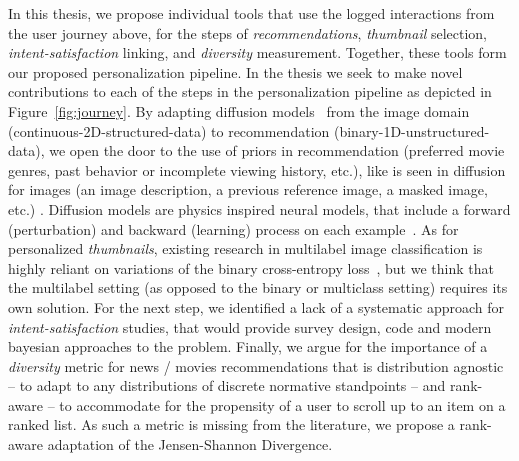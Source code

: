 
In this thesis, we propose individual tools that use the logged interactions from the user journey above, for the steps of \emph{recommendations}, \emph{thumbnail} selection, \emph{intent-satisfaction} linking, and \emph{diversity} measurement. 
Together, these tools form our proposed personalization pipeline. In the thesis we seek to make novel contributions to each of the steps in the personalization pipeline as depicted in Figure~\ref{fig:journey}.
By adapting diffusion models~\cite{jascha} from the image domain (continuous-2D-structured-data) to recommendation (binary-1D-unstructured-data), we open the door to the use of priors in recommendation (preferred movie genres, past behavior or incomplete viewing history, etc.), like is seen in diffusion for images (an image description, a previous reference image, a masked image, etc.) . Diffusion models are physics inspired neural models, that include a forward (perturbation) and backward (learning) process on each example~\cite{jascha}.  As for personalized \emph{thumbnails}, existing research in multilabel image classification is highly reliant on variations of the binary cross-entropy loss~\cite{fisher}, but we think that the multilabel setting (as opposed to the binary or multiclass setting) requires its own solution. For the next step, we identified a lack of a systematic approach for \emph{intent-satisfaction} studies, that would provide survey design, code and modern bayesian approaches to the problem. 
Finally, we argue for the importance of a \emph{diversity} metric for news / movies recommendations that is distribution agnostic -- to adapt to any distributions of discrete normative standpoints -- and rank-aware -- to accommodate for the propensity of a user to scroll up to an item on a ranked list. 
As such a metric is missing from the literature, we propose a rank-aware adaptation of the Jensen-Shannon Divergence.


